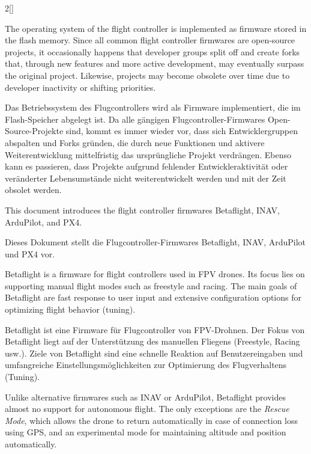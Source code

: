 \begin{paracol}{2}[]
\coleng

The operating system of the flight controller is implemented as firmware stored in the flash memory. Since all common flight controller firmwares are open-source projects, it occasionally happens that developer groups split off and create forks that, through new features and more active development, may eventually surpass the original project. Likewise, projects may become obsolete over time due to developer inactivity or shifting priorities.

\colger

Das Betriebssystem des Flugcontrollers wird als Firmware implementiert, die im Flash-Speicher abgelegt ist. Da alle gängigen Flugcontroller-Firmwares Open-Source-Projekte sind, kommt es immer wieder vor, dass sich Entwicklergruppen abspalten und Forks gründen, die durch neue Funktionen und aktivere Weiterentwicklung mittelfristig das ursprüngliche Projekt verdrängen. Ebenso kann es passieren, dass Projekte aufgrund fehlender Entwickleraktivität oder veränderter Lebensumstände nicht weiterentwickelt werden und mit der Zeit obsolet werden.

\coleng

This document introduces the flight controller firmwares Betaflight, INAV, ArduPilot, and PX4.

\colger

Dieses Dokument stellt die Flugcontroller-Firmwares Betaflight, INAV, ArduPilot und PX4 vor.

\colende

\renewcommand{\deutschertitel}{Betaflight}
\renewcommand{\englischertitel}{Betaflight}
\makroabschnitt
\label{AbschnittBetaflight}

Betaflight is a firmware for flight controllers used in FPV drones. Its focus lies on supporting manual flight modes such as freestyle and racing. The main goals of Betaflight are fast response to user input and extensive configuration options for optimizing flight behavior (tuning).

\colger

Betaflight ist eine Firmware für Flugcontroller von FPV-Drohnen. Der Fokus von Betaflight liegt auf der Unterstützung des manuellen Fliegens (Freestyle, Racing usw.). Ziele von Betaflight sind eine schnelle Reaktion auf Benutzereingaben und umfangreiche Einstellungsmöglichkeiten zur Optimierung des Flugverhaltens (Tuning).

\coleng

Unlike alternative firmwares such as INAV or ArduPilot, Betaflight provides almost no support for autonomous flight. The only exceptions are the \textsl{Rescue Mode}, which allows the drone to return automatically in case of connection loss using GPS, and an experimental mode for maintaining altitude and position automatically.


\end{paracol}

